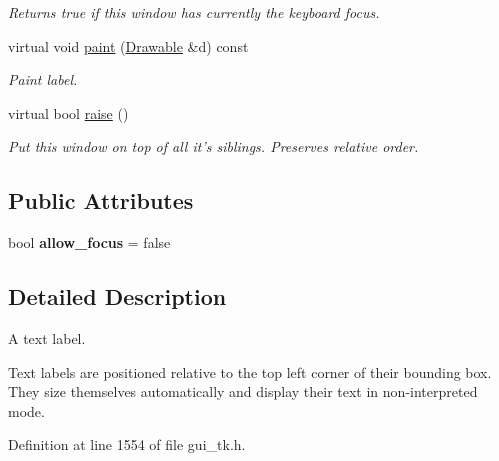 \begin{DoxyCompactItemize}
\begin{DoxyCompactList}\small\item\em Returns {\ttfamily true} if this window has currently the keyboard focus. \end{DoxyCompactList}\item 
\hypertarget{classGUI_1_1Label_a797c2ce94314014b2775114a046c67b7}{virtual void \hyperlink{classGUI_1_1Label_a797c2ce94314014b2775114a046c67b7}{paint} (\hyperlink{classGUI_1_1Drawable}{Drawable} \&d) const }\label{classGUI_1_1Label_a797c2ce94314014b2775114a046c67b7}

\begin{DoxyCompactList}\small\item\em Paint label. \end{DoxyCompactList}\item 
virtual bool \hyperlink{classGUI_1_1Label_ae974cb75928cf5fcb0574d59d3b41a43}{raise} ()
\begin{DoxyCompactList}\small\item\em Put this window on top of all it's siblings. Preserves relative order. \end{DoxyCompactList}\end{DoxyCompactItemize}
\subsection*{Public Attributes}
\begin{DoxyCompactItemize}
\item 
\hypertarget{classGUI_1_1Label_a1b99913d11d7041a667648c395d5231f}{bool {\bfseries allow\-\_\-focus} = false}\label{classGUI_1_1Label_a1b99913d11d7041a667648c395d5231f}

\end{DoxyCompactItemize}


\subsection{Detailed Description}
A text label. 

Text labels are positioned relative to the top left corner of their bounding box. They size themselves automatically and display their text in non-\/interpreted mode. 

Definition at line 1554 of file gui\-\_\-tk.\-h.



